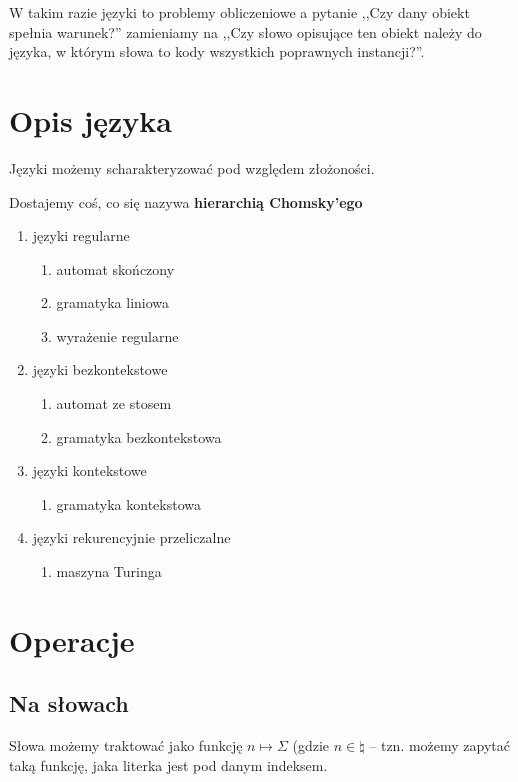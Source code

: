W takim razie języki to problemy obliczeniowe a pytanie ,,Czy dany obiekt spełnia warunek?'' zamieniamy na ,,Czy słowo opisujące ten obiekt należy do języka, w którym słowa to kody wszystkich poprawnych instancji?''.

\section{Opis języka}
Języki możemy scharakteryzować pod względem złożoności.

Dostajemy coś, co się nazywa \textbf{hierarchią Chomsky'ego}
\begin{enumerate}
	\item języki regularne
	      \begin{enumerate}
		      \item automat skończony
		      \item gramatyka liniowa
		      \item wyrażenie regularne
	      \end{enumerate}

	\item języki bezkontekstowe
	      \begin{enumerate}
		      \item automat ze stosem
		      \item gramatyka bezkontekstowa
	      \end{enumerate}

	\item języki kontekstowe
	      \begin{enumerate}
		      \item gramatyka kontekstowa
	      \end{enumerate}

	\item języki rekurencyjnie przeliczalne
	      \begin{enumerate}
		      \item maszyna Turinga
	      \end{enumerate}
\end{enumerate}

\section{Operacje}
\subsection{Na słowach}
Słowa możemy traktować jako funkcję \(n \mapsto \Sigma\) (gdzie \( n \in \natural \) -- tzn. możemy zapytać taką funkcję, jaka literka jest pod danym indeksem.

